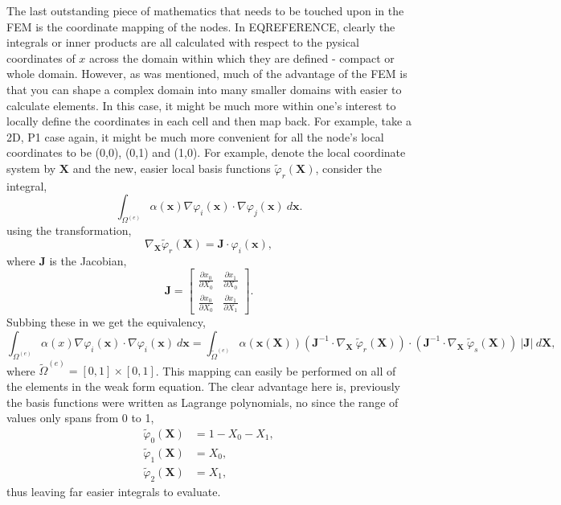 The last outstanding piece of mathematics that needs to be touched upon in the FEM is the coordinate mapping of the nodes. In EQREFERENCE,  clearly the integrals or inner products are all calculated with respect to the pysical coordinates of $x$ across the domain within which they are defined - compact or whole domain. However, as was mentioned, much of the advantage of the FEM is that you can shape a complex domain into many smaller domains with easier to calculate elements. In this case, it might be much more within one's interest to locally define the coordinates in each cell and then map back. For example, take a 2D, P1 case again, it might be much more convenient for all the node's local coordinates to be (0,0), (0,1) and (1,0). For example, denote the local coordinate system by $\mathbf{X}$ and the new, easier local basis functions $\tilde\varphi_r(\mathbf{X})$, consider the integral,
\begin{equation}
	\int_{\Omega^{(e)}} \alpha(\mathbf{x})\nabla \varphi_i(\mathbf{x}) \cdot \nabla \varphi_j(\mathbf{x})~d\mathbf{x}.
\end{equation}
using the transformation,
\begin{equation}
	\nabla_\mathbf{X}\tilde\varphi_r(\mathbf{X}) = \mathbf{J}\cdot \varphi_i(\mathbf{x}),
\end{equation}
where $\mathbf{J}$ is the Jacobian,
\begin{equation}
	\mathbf{J} =
	\left[\begin{matrix}
		\frac{\partial x_0}{\partial X_0} & \frac{\partial x_1}{\partial X_0}\\
		\frac{\partial x_0}{\partial X_0} & \frac{\partial x_1}{\partial X_1}
	\end{matrix}\right].
\end{equation}
Subbing these in we get the equivalency,
\begin{equation}
	\int_{\Omega^{(e)}} \alpha(x)\nabla \varphi_i(\mathbf{x}) \cdot \nabla \varphi_i(\mathbf{x})~d\mathbf{x} = \int_{\tilde{\Omega}^{(e)}} \alpha(\mathbf{x}(\mathbf{X}))(\mathbf{J}^{-1}\cdot\nabla_\mathbf{X}~\tilde\varphi_r(\mathbf{X}) )\cdot(\mathbf{J}^{-1}\cdot\nabla_\mathbf{X}~\tilde\varphi_s(\mathbf{X}))~\vert\mathbf{J}\vert~d\mathbf{X},
\end{equation}
where ${\tilde{\Omega}^{(e)}} = [0,1]\times[0,1]$. This mapping can easily be performed on all of the elements in the weak form equation. The clear advantage here is, previously the basis functions were written as Lagrange polynomials, no since the range of values only spans from 0 to 1,
\begin{align}
	\tilde\varphi_0(\mathbf{X}) &= 1 - X_0 - X_1,\\
	\tilde\varphi_1(\mathbf{X}) &= X_0,\\
	\tilde\varphi_2(\mathbf{X}) &= X_1,
\end{align}
thus leaving far easier integrals to evaluate.

